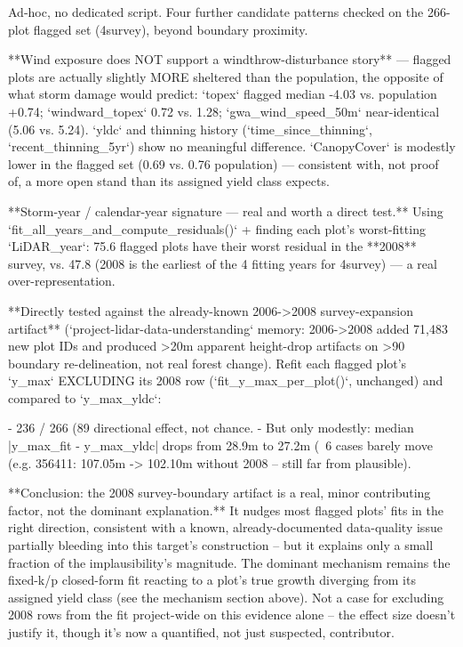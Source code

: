 Ad-hoc, no dedicated script. Four further candidate patterns checked on the 266-plot flagged set
(4survey), beyond boundary proximity.

**Wind exposure does NOT support a windthrow-disturbance story** — flagged plots are actually
slightly MORE sheltered than the population, the opposite of what storm damage would predict:
`topex` flagged median -4.03 vs. population +0.74; `windward_topex` 0.72 vs. 1.28;
`gwa_wind_speed_50m` near-identical (5.06 vs. 5.24). `yldc` and thinning history (`time_since_thinning`,
`recent_thinning_5yr`) show no meaningful difference. `CanopyCover` is modestly lower in the
flagged set (0.69 vs. 0.76 population) — consistent with, not proof of, a more open stand than its
assigned yield class expects.

**Storm-year / calendar-year signature — real and worth a direct test.** Using
`fit_all_years_and_compute_residuals()` + finding each plot's worst-fitting `LiDAR_year`: 75.6%
flagged plots have their worst residual in the **2008** survey, vs. 47.8%
(2008 is the earliest of the 4 fitting years for 4survey) — a real over-representation.

**Directly tested against the already-known 2006->2008 survey-expansion artifact**
(`project-lidar-data-understanding` memory: 2006->2008 added 71,483 new plot IDs and produced
>20m apparent height-drop artifacts on >90%
boundary re-delineation, not real forest change). Refit each flagged plot's `y_max` EXCLUDING its
2008 row (`fit_y_max_per_plot()`, unchanged) and compared to `y_max_yldc`:

- 236 / 266 (89%
  directional effect, not chance.
- But only modestly: median |y_max_fit - y_max_yldc| drops from 28.9m to 27.2m (~6%
  cases barely move (e.g. 356411: 107.05m -> 102.10m without 2008 -- still far from plausible).

**Conclusion: the 2008 survey-boundary artifact is a real, minor contributing factor, not the
dominant explanation.** It nudges most flagged plots' fits in the right direction, consistent with
a known, already-documented data-quality issue partially bleeding into this target's construction
-- but it explains only a small fraction of the implausibility's magnitude. The dominant mechanism
remains the fixed-k/p closed-form fit reacting to a plot's true growth diverging from its assigned
yield class (see the mechanism section above). Not a case for excluding 2008 rows from the fit
project-wide on this evidence alone -- the effect size doesn't justify it, though it's now a
quantified, not just suspected, contributor.

